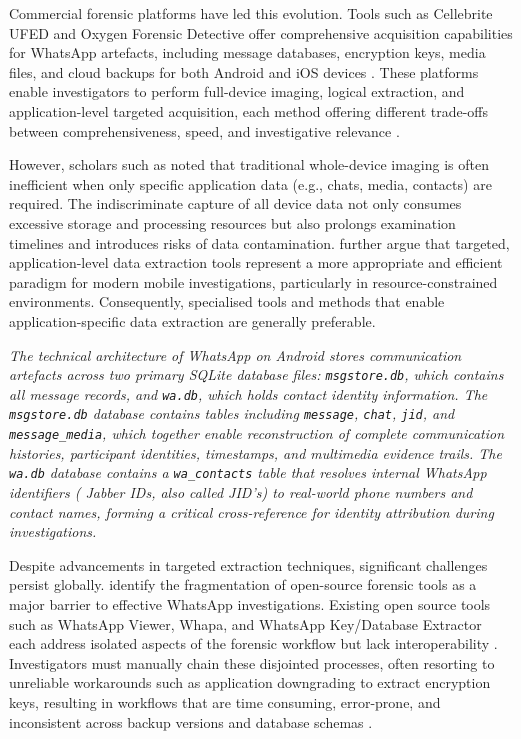 \documentclass[12pt,a4paper]{report}
\begin{document}
Commercial forensic platforms have led this evolution. Tools such as Cellebrite UFED and Oxygen Forensic Detective offer comprehensive acquisition capabilities for WhatsApp artefacts, including message databases, encryption keys, media files, and cloud backups for both Android and iOS devices \citep{nishchal2024}. These platforms enable investigators to perform full-device imaging, logical extraction, and application-level targeted acquisition, each method offering different trade-offs between comprehensiveness, speed, and investigative relevance \citep{sutikno2024, oxygen2023}.

However, scholars such as \citet{nishchal2024} noted that traditional whole-device imaging is often inefficient when only specific application data (e.g., chats, media, contacts) are required. The indiscriminate capture of all device data not only consumes excessive storage and processing resources but also prolongs examination timelines and introduces risks of data contamination. \citet{aggarwal2019} further argue that targeted, application-level data extraction tools represent a more appropriate and efficient paradigm for modern mobile investigations, particularly in resource-constrained environments. Consequently, specialised tools and methods that enable application-specific data extraction are generally preferable.

\emph{The technical architecture of WhatsApp on Android stores communication artefacts across two primary SQLite database files: \texttt{msgstore.db}, which contains all message records, and \texttt{wa.db}, which holds contact identity information. The \texttt{msgstore.db} database contains tables including \texttt{message}, \texttt{chat}, \texttt{jid}, and \texttt{message\_media}, which together enable reconstruction of complete communication histories, participant identities, timestamps, and multimedia evidence trails. The \texttt{wa.db} database contains a \texttt{wa\_contacts} table that resolves internal WhatsApp identifiers ( Jabber IDs, also called JID's) to real-world phone numbers and contact names, forming a critical cross-reference for identity attribution during investigations.}

Despite advancements in targeted extraction techniques, significant challenges persist globally. \citet{tusharanshu2023} identify the fragmentation of open-source forensic tools as a major barrier to effective WhatsApp investigations. Existing open source tools such as WhatsApp Viewer, Whapa, and WhatsApp Key/Database Extractor each address isolated aspects of the forensic workflow but lack interoperability \citep{tusharanshu2023}. Investigators must manually chain these disjointed processes, often resorting to unreliable workarounds such as application downgrading to extract encryption keys, resulting in workflows that are time consuming, error-prone, and inconsistent across backup versions and database schemas \citep{nishchal2024, tusharanshu2023}.
\end{document}
